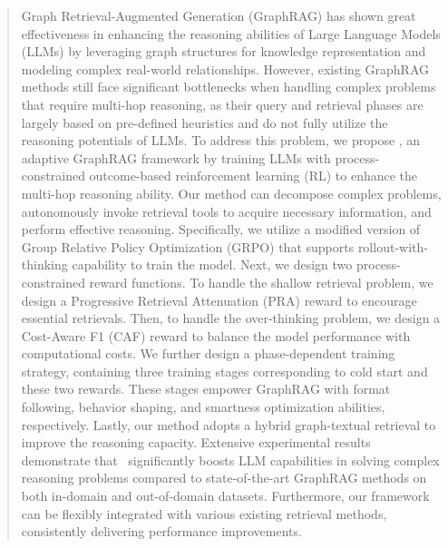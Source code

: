 \documentclass[sigconf]{acmart}
\begin{document}
\author{Qingyun Sun}

\author{Jianxin Li}

\author{Ziwei Zhang}
\authornotemark[1]



\renewcommand{\shortauthors}{Chuanyue Yu et al.}

\begin{abstract}
Graph Retrieval-Augmented Generation (GraphRAG) has shown great effectiveness in enhancing the reasoning abilities of Large Language Models (LLMs) by leveraging graph structures for knowledge representation and modeling complex real-world relationships. However, existing GraphRAG methods still face significant bottlenecks when handling complex problems that require multi-hop reasoning, as  %
their query and retrieval phases are largely based on pre-defined heuristics and do not fully utilize the reasoning potentials of LLMs.  
To address this problem, we propose \methodname, an adaptive GraphRAG framework by training LLMs with process-constrained outcome-based reinforcement learning (RL) to enhance the multi-hop reasoning ability. Our method can decompose complex problems, autonomously invoke retrieval tools to acquire necessary information, and perform effective reasoning.
Specifically, we utilize a modified version of Group Relative Policy Optimization (GRPO) that supports rollout-with-thinking capability to train the model. Next, we design two process-constrained reward functions. To handle the shallow retrieval problem, we design a Progressive Retrieval Attenuation (PRA) reward to encourage essential retrievals. Then, to handle the over-thinking problem, we design a Cost-Aware F1 (CAF) reward to balance the model performance with computational costs. 
We further design a phase-dependent training strategy, containing three training stages corresponding to cold start and these two rewards. These stages empower GraphRAG with format following, behavior shaping, and smartness optimization abilities, respectively.
Lastly, our method adopts a hybrid graph-textual retrieval to improve the reasoning capacity.
Extensive experimental results demonstrate that \methodname~significantly boosts LLM capabilities in solving complex reasoning problems compared to state-of-the-art GraphRAG methods on both in-domain and out-of-domain datasets. Furthermore, our framework can be flexibly integrated with various existing retrieval methods, consistently delivering performance improvements.









\end{abstract}
\end{document}
